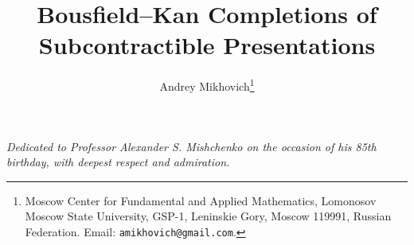 \documentclass[11pt,a4paper]{article}
\newcommand*{\pkg}[1]{{\mdseries\textsf{#1}}}
\begin{document}
\title{Bousfield--Kan Completions of Subcontractible Presentations}
\author{Andrey Mikhovich\thanks{Moscow Center for Fundamental and Applied
Mathematics, Lomonosov Moscow State University, GSP-1, Leninskie Gory,
Moscow 119991, Russian Federation. Email: \texttt{amikhovich@gmail.com}.}}
\date{}
\maketitle

\begin{center}
\textit{Dedicated to Professor Alexander S. Mishchenko on the occasion of his
85th birthday, with deepest respect and admiration.}
\end{center}



\end{document}
